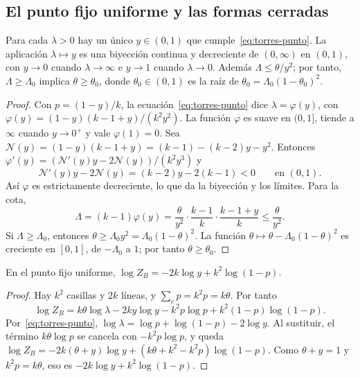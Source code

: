 \subsection{El punto fijo uniforme y las formas cerradas}

\begin{lema}\label{lem:torres-punto}
Para cada $\lambda>0$ hay un único $y\in(0,1)$ que cumple~\eqref{eq:torres-punto}. La aplicación
$\lambda\mapsto y$ es una biyección continua y decreciente de $(0,\infty)$ en $(0,1)$, con $y\to0$ cuando
$\lambda\to\infty$ e $y\to1$ cuando $\lambda\to0$. Además $\Lambda\le\theta/y^2$; por tanto,
$\Lambda\ge\Lambda_0$ implica $\theta\ge\theta_0$, donde $\theta_0\in(0,1)$ es la raíz de
$\theta_0=\Lambda_0(1-\theta_0)^2$.
\end{lema}
\begin{proof}
Con $p=(1-y)/k$, la ecuación~\eqref{eq:torres-punto} dice $\lambda=\varphi(y)$, con
$\varphi(y)=(1-y)(k-1+y)/(k^2y^2)$. La función $\varphi$ es suave en $(0,1]$, tiende a $\infty$ cuando
$y\to0^+$ y vale $\varphi(1)=0$. Sea $\mathcal N(y)=(1-y)(k-1+y)=(k-1)-(k-2)y-y^2$. Entonces
$\varphi'(y)=(\mathcal N'(y)y-2\mathcal N(y))/(k^2y^3)$ y
\[
 \mathcal N'(y)y-2\mathcal N(y)=(k-2)y-2(k-1)<0\qquad\text{en }(0,1).
\]
Así $\varphi$ es estrictamente decreciente, lo que da la biyección y los límites. Para la cota,
\[
 \Lambda=(k-1)\varphi(y)=\frac{\theta}{y^2}\cdot\frac{k-1}k\cdot\frac{k-1+y}k\le\frac\theta{y^2}.
\]
Si $\Lambda\ge\Lambda_0$, entonces $\theta\ge\Lambda_0y^2=\Lambda_0(1-\theta)^2$. La función
$\theta\mapsto\theta-\Lambda_0(1-\theta)^2$ es creciente en $[0,1]$, de $-\Lambda_0$ a $1$; por tanto
$\theta\ge\theta_0$.
\end{proof}

\begin{lema}[Árbol]\label{lem:torres-arbol}
En el punto fijo uniforme, $\log Z_B=-2k\log y+k^2\log(1-p)$.
\end{lema}
\begin{proof}
Hay $k^2$ casillas y $2k$ líneas, y $\sum_cp=k^2p=k\theta$. Por tanto
\[
 \log Z_B=k\theta\log\lambda-2ky\log y-k^2p\log p+k^2(1-p)\log(1-p).
\]
Por~\eqref{eq:torres-punto}, $\log\lambda=\log p+\log(1-p)-2\log y$. Al sustituir, el término
$k\theta\log p$ se cancela con $-k^2p\log p$, y queda
$\log Z_B=-2k(\theta+y)\log y+(k\theta+k^2-k^2p)\log(1-p)$. Como $\theta+y=1$ y $k^2p=k\theta$, eso es
$-2k\log y+k^2\log(1-p)$.
\end{proof}

